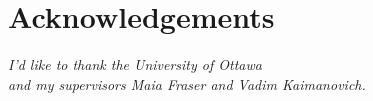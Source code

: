 \section*{Acknowledgements}
\vspace{5cm}
\begin{center}
  \begin{minipage}[c]{0.7\linewidth}
    \begin{center}
      \vspace{1cm}
      \textit{I'd like to thank the University of Ottawa \\
        and my supervisors Maia Fraser and Vadim Kaimanovich.}
    \end{center}
  \end{minipage}
\end{center}

